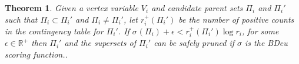 \documentclass[letterpaper]{article}
\newcommand{\score}[2]{\sigma_{#1}({#2})}
\newtheorem{theorem}{Theorem}
\newtheorem{corollary}{Corollary}
\begin{document}




\begin{theorem}
Given a vertex variable $V_i$ and candidate parent sets $\Pi_i$ and $\Pi_i'$ such that $\Pi_i \subset \Pi_i'$ and $\Pi_i \neq \Pi_i'$, let
$r_i^{+}(\Pi_i')$ be the number of positive counts in the contingency table for $\Pi_i'$. If $\score{}{\Pi_i} + \epsilon < r_i^{+}(\Pi_i') \log r_i$, for some $\epsilon \in \mathbb{R^+}$ then $\Pi_i'$ and the supersets of $\Pi_i'$ can be safely pruned if $\sigma$ is the BDeu scoring function..
\end{theorem}
\end{document}
